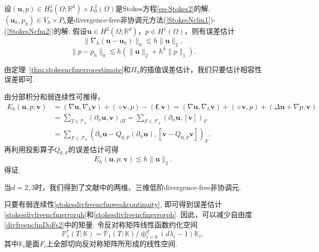 \begin{lemma}
设$(\boldsymbol{u}, p)\in H_0^{1}(\Omega; \mathbb{R}^{d})\times L_{0}^{2}(\Omega)$是Stokes方程\eqref{eq-Stokes2}的解, $(\boldsymbol{u}_h, p_h)\in V_h\times P_h$是divergence-free非协调元方法(\ref{StokesNcfm1})-(\ref{StokesNcfm2})的解. 假设$\boldsymbol{u}\in H^{2}(\Omega; \mathbb{R}^{d})$，$p\in H^{1}(\Omega)$，则有误差估计
\begin{equation}\label{stokesdivfreencfmerroruh}
\|\nabla_h(\boldsymbol{u}-\boldsymbol{u}_h)\|_0\lesssim h\|\boldsymbol{u}\|_2,
\end{equation}
\begin{equation}\label{stokesdivfreencfmerrorph}
\|p-p_h\|_0\lesssim h(\|\boldsymbol{u}\|_2+h^{k}\|p\|_1).
\end{equation}
\end{lemma}
\begin{prf}
由定理~\ref{thm:stokesncfmerrorestimate}和$\Pi_h$的插值误差估计，我们只要估计相容性误差即可.

由分部积分和弱连续性可推得，
\begin{align*}
E_h(\boldsymbol{u},p;\boldsymbol{v})&=(\nabla\boldsymbol{u}, \nabla_h\boldsymbol{v}) + (\div\boldsymbol{v}, p) -(\boldsymbol{f},\boldsymbol{v})=(\nabla\boldsymbol{u}, \nabla_h\boldsymbol{v}) + (\div\boldsymbol{v}, p) + (\Delta\boldsymbol{u}+\nabla p,\boldsymbol{v}) \\
&=\sum_{T\in\mathcal T_h}(\partial_n\boldsymbol{u}, \boldsymbol{v})_{\partial T}=\sum_{F\in\mathcal F_h}(\partial_n\boldsymbol{u}, [\boldsymbol{v}])_F \\
&=\sum_{F\in\mathcal F_h}(\partial_n\boldsymbol{u}-Q_{0,F}(\partial_n\boldsymbol{u}), [\boldsymbol{v}-Q_{0,F}\boldsymbol{v}])_F.
\end{align*}
再利用投影算子$Q_{0,F}$的误差估计可得
\begin{equation*}
E_h(\boldsymbol{u},p;\boldsymbol{v})\lesssim h\|\boldsymbol{u}\|_2.
\end{equation*}
得证.
\end{prf}

当$d=2,3$时，我们得到了文献\cite{XieXuXue2008}中的两维、三维低阶divergence-free非协调元.

只要有弱连续性\eqref{stokesdivfreencfmweakcontinuity}, 即可得到误差估计\eqref{stokesdivfreencfmerroruh}和\eqref{stokesdivfreencfmerrorph}. 因此，可以减少自由度\eqref{divfreencfmDoFs2}中的矩量.
令反对称矩阵线性函数约化空间
\begin{equation*}
\mathbb P_1^r(T;\mathbb K)=\mathbb P_1(T;\mathbb K)/\oplus_{i=0}^d(d\lambda_i-1)\mathbb K_i,
\end{equation*}
其中$\mathbb K_i$是面$F_i$上全部切向反对称矩阵所形成的线性空间.

